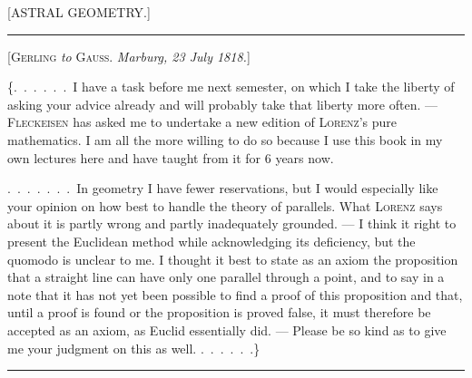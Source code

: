 \clearpage{}
\begin{center}[ASTRAL GEOMETRY.]\end{center}

\begin{center}\rule{3cm}{0.4pt}\end{center}

\begin{center}[\textsc{Gerling} \emph{to} \textsc{Gauss}. \emph{Marburg, 23 July 1818.}]\end{center}

\{.\ .\ .\ .\ .\ .\ I have a task before me next semester, on which I
take the liberty of asking your advice already and will probably
take that liberty more often. --- \textsc{Fleckeisen} has
asked me to undertake a new edition of \textsc{Lorenz}'s
pure mathematics. I am all the more willing to do so because
I use this book in my own lectures here and have taught from it
for 6 years now.

.\ .\ .\ .\ .\ .\ .\ In geometry I have fewer reservations, but I would especially
like your opinion on how best to handle the
theory of parallels. What \textsc{Lorenz} says about it is partly wrong and partly
inadequately grounded. --- I think it right to present the Euclidean method while
acknowledging its deficiency, but the quomodo is
unclear to me. I thought it best to state as an axiom the proposition that a straight
line can have only one parallel through a point,
and to say in a note that it has not yet been possible to find a proof of
this proposition and that, until a proof is found
or the proposition is proved false, it must therefore be accepted as an axiom,
as Euclid essentially did. --- Please be
so kind as to give me your judgment on this as well. .\ .\ .\ .\ .\ .\}

\begin{center}\rule{3cm}{0.4pt}\end{center}

